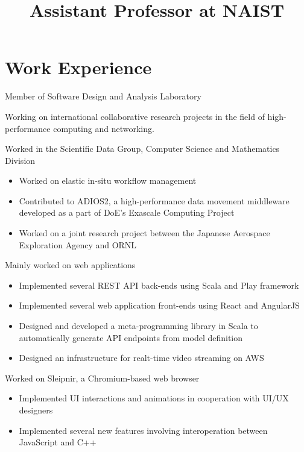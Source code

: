 \documentclass[10pt,a4paper,sans]{moderncv}
\title{Assistant Professor at NAIST}
\begin{document}
\makecvtitle

\section{Work Experience}

%
{%
Member of Software Design and Analysis Laboratory
}

%
{%
Working on international collaborative research projects in the field of
high-performance computing and networking.
}

%
{%
Worked in the Scientific Data Group, Computer Science and Mathematics Division
\begin{itemize}%
\item Worked on elastic in-situ workflow management
\item Contributed to ADIOS2, a high-performance data movement middleware
    developed as a part of DoE's Exascale Computing Project
\item Worked on a joint research project between the Japanese Aerospace
    Exploration Agency and ORNL
\end{itemize}
}

%
{Mainly worked on web applications%
\begin{itemize}%
\item Implemented several REST API back-ends using Scala and Play framework
\item Implemented several web application front-ends using React and AngularJS
\item Designed and developed a meta-programming library in Scala to
    automatically generate API endpoints from model definition
\item Designed an infrastructure for realt-time video streaming on AWS
\end{itemize}}

%
{Worked on Sleipnir, a Chromium-based web browser%
\begin{itemize}%
\item Implemented UI interactions and animations in cooperation with UI/UX designers
\item Implemented several new features involving interoperation between
    JavaScript and C++
\end{itemize}}
\end{document}
